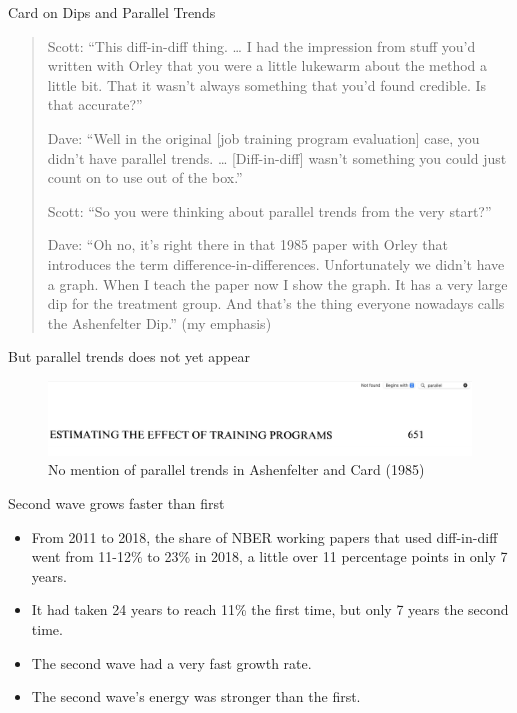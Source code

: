 \documentclass{beamer}
\begin{document}
\begin{frame}{Card on Dips and Parallel Trends}

\begin{quote}
Scott: “This diff-in-diff thing. … I had the impression from stuff you’d written with Orley that you were a little lukewarm about the method a little bit. That it wasn’t always something that you’d found credible. Is that accurate?”

Dave: “Well in the original [job training program evaluation] case, you didn’t have parallel trends. … [Diff-in-diff] wasn’t something you could just count on to use out of the box.”

Scott: “So you were thinking about parallel trends from the very start?”

Dave: “Oh no, it’s right there in that 1985 paper with Orley that introduces the term difference-in-differences. Unfortunately we didn’t have a graph. When I teach the paper now I show the graph. It has a very large dip for the treatment group. And that’s the thing everyone nowadays calls the Ashenfelter Dip.” (my emphasis)


\end{quote}

\end{frame}


\begin{frame}{But parallel trends does not yet appear}

	\begin{figure}
	\caption{No mention of parallel trends in Ashenfelter and Card (1985)}
	\includegraphics[scale=0.2]{./lecture_includes/nomention.png}
	\end{figure}

\end{frame}




\begin{frame}{Second wave grows faster than first}

\begin{itemize}
\item From 2011 to 2018, the share of NBER working papers that used diff-in-diff went from 11-12\% to 23\% in 2018, a little over 11 percentage points in only 7 years. 
\item It had taken 24 years to reach 11\% the first time, but only 7 years the second time. 
\item The second wave had a very fast growth rate. 
\item The second wave’s energy was stronger than the first.
\end{itemize}

\end{frame}
\end{document}
